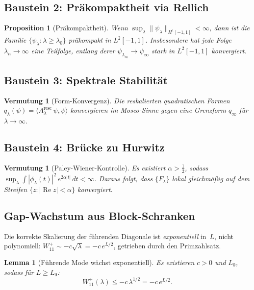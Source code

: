 \documentclass[12pt,a4paper]{article}
\newtheorem{lemma}[theorem]{Lemma}
\newtheorem{proposition}[theorem]{Proposition}
\newtheorem{conjecture}[theorem]{Vermutung}
\theoremstyle{definition}
\theoremstyle{remark}
\begin{document}
\subsection{Baustein 2: Präkompaktheit via Rellich}

\begin{proposition}[Präkompaktheit]
\label{prop:precompact}
Wenn $\sup_\lambda \|\psi_\lambda\|_{H^1[-1,1]} < \infty$, dann ist die Familie $\{\psi_\lambda : \lambda \geq \lambda_0\}$ präkompakt in $L^2[-1,1]$. Insbesondere hat jede Folge $\lambda_n \to \infty$ eine Teilfolge, entlang derer $\psi_{\lambda_{n_k}} \to \psi_\infty$ stark in $L^2[-1,1]$ konvergiert.
\end{proposition}

\subsection{Baustein 3: Spektrale Stabilität}

\begin{conjecture}[Form-Konvergenz]
\label{conj:mosco}
Die reskalierten quadratischen Formen $q_\lambda(\psi) = \langle A_\lambda^{\mathrm{resc}}\,\psi, \psi\rangle$ konvergieren im Mosco-Sinne gegen eine Grenzform $q_\infty$ für $\lambda \to \infty$.
\end{conjecture}

\subsection{Baustein 4: Brücke zu Hurwitz}

\begin{conjecture}[Paley-Wiener-Kontrolle]
\label{conj:pw}
Es existiert $\alpha > \tfrac{1}{2}$, sodass $\sup_\lambda \int |\phi_\lambda(t)|^2\,e^{2\alpha|t|}\,dt < \infty$. Daraus folgt, dass $\{F_\lambda\}$ lokal gleichmäßig auf dem Streifen $\{z : |\operatorname{Re} z| < \alpha\}$ konvergiert.
\end{conjecture}

\subsection{Gap-Wachstum aus Block-Schranken}
\label{sec:gap-growth-block}

Die korrekte Skalierung der führenden Diagonale ist \emph{exponentiell} in~$L$, nicht polynomiell: $W_{11}^+ \sim -c\sqrt{\lambda} = -c\,e^{L/2}$, getrieben durch den Primzahlsatz.

\begin{lemma}[Führende Mode wächst exponentiell]
\label{lem:L1}
Es existieren $c > 0$ und $L_0$, sodass für $L \geq L_0$:
\[
  W_{11}^+(\lambda) \leq -c\,\lambda^{1/2} = -c\,e^{L/2}.
\]
\end{lemma}
\end{document}
